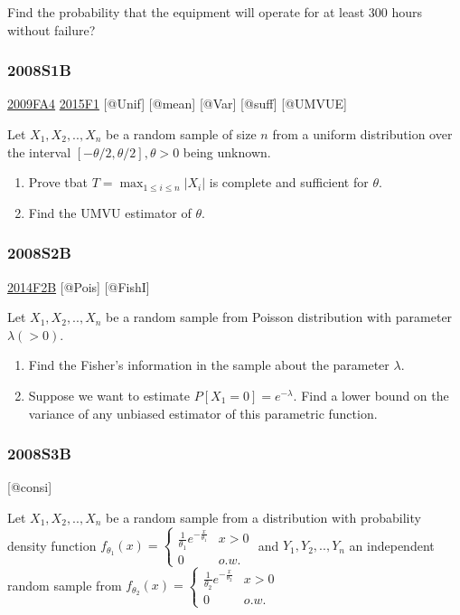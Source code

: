 \documentclass[6pt,twocolumn,Portrait]{article}
\begin{document}
Find the probability that the equipment will operate for at least 300
hours without failure?

\hypertarget{s1b}{%
\subsubsection{2008S1B}\label{s1b}}

\protect\hyperlink{fa4}{2009FA4} \protect\hyperlink{f1-5}{2015F1}
{[}@Unif{]} {[}@mean{]} {[}@Var{]} {[}@suff{]} {[}@UMVUE{]}

Let \(X_1,X_2,..,X_{n}\) be a random sample of size \(n\) from a uniform
distribution over the interval \([-\theta/2,\theta/2], \theta>0\) being
unknown.

\begin{enumerate}
\def\labelenumi{(\alph{enumi})}
\item
  Prove tbat \(T=\max_{1\le i\le n}|X_{i}|\) is complete and sufficient
  for \(\theta\).
\item
  Find the UMVU estimator of \(\theta\).
\end{enumerate}

\hypertarget{s2b}{%
\subsubsection{2008S2B}\label{s2b}}

\protect\hyperlink{f2b-1}{2014F2B} {[}@Pois{]} {[}@FishI{]}

Let \(X_1,X_2,..,X_{n}\) be a random sample from Poisson distribution
with parameter \(\lambda(>0)\).

\begin{enumerate}
\def\labelenumi{(\alph{enumi})}
\item
  Find the Fisher's information in the sample about the parameter
  \(\lambda\).
\item
  Suppose we want to estimate \(P[X_1=0]=e^{-\lambda}\). Find a lower
  bound on the variance of any unbiased estimator of this parametric
  function.
\end{enumerate}

\hypertarget{s3b}{%
\subsubsection{2008S3B}\label{s3b}}

{[}@consi{]}

Let \(X_1,X_2,..,X_{n}\) be a random sample from a distribution with
probability density function
\(f_{\theta_1}(x)=\begin{cases}\frac1{\theta_1} e^{-\frac{x}{\theta_1}}& x>0\\0& o.w.\end{cases}\)
and \(Y_1,Y_2,..,Y_{n}\) an independent random sample from
\(f_{\theta_2}(x)=\begin{cases}\frac1{\theta_2} e^{-\frac{x}{\theta_2}}& x>0\\0& o.w.\end{cases}\)
\end{document}
